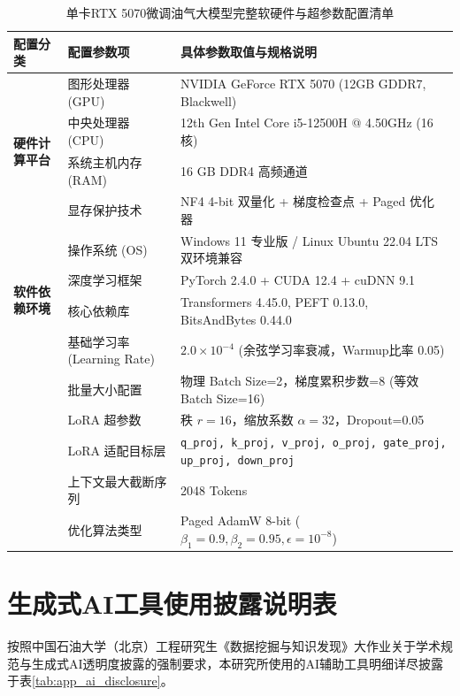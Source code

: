 \documentclass[UTF8,a4paper,zihao=-4,openany,twoside]{ctexbook}
\begin{document}
\begin{table}[htbp]
\centering
\caption{单卡RTX 5070微调油气大模型完整软硬件与超参数配置清单}
\label{tab:app_hyperparams}
\begin{tabularx}{\textwidth}{llX}
\toprule
\textbf{配置分类} & \textbf{配置参数项} & \textbf{具体参数取值与规格说明} \\
\midrule
\multirow{4}{*}{\textbf{硬件计算平台}} & 图形处理器 (GPU) & NVIDIA GeForce RTX 5070 (12GB GDDR7, Blackwell) \\
& 中央处理器 (CPU) & 12th Gen Intel Core i5-12500H @ 4.50GHz (16核) \\
& 系统主机内存 (RAM) & 16 GB DDR4 高频通道 \\
& 显存保护技术 & NF4 4-bit 双量化 + 梯度检查点 + Paged 优化器 \\
\midrule
\multirow{4}{*}{\textbf{软件依赖环境}} & 操作系统 (OS) & Windows 11 专业版 / Linux Ubuntu 22.04 LTS 双环境兼容 \\
& 深度学习框架 & PyTorch 2.4.0 + CUDA 12.4 + cuDNN 9.1 \\
& 核心依赖库 & Transformers 4.45.0, PEFT 0.13.0, BitsAndBytes 0.44.0 \\
\midrule
\multirow{6}{*}{\textbf{微调核心超参数}} & 基础学习率 (Learning Rate) & $2.0 \times 10^{-4}$ (余弦学习率衰减，Warmup比率 0.05) \\
& 批量大小配置 & 物理 Batch Size=2，梯度累积步数=8 (等效 Batch Size=16) \\
& LoRA 超参数 & 秩 $r=16$，缩放系数 $\alpha=32$，Dropout=0.05 \\
& LoRA 适配目标层 & \texttt{q\_proj, k\_proj, v\_proj, o\_proj, gate\_proj, up\_proj, down\_proj} \\
& 上下文最大截断序列 & 2048 Tokens \\
& 优化算法类型 & Paged AdamW 8-bit ($\beta_1=0.9, \beta_2=0.95, \epsilon=10^{-8}$) \\
\bottomrule
\end{tabularx}
\end{table}

\chapter{生成式AI工具使用披露说明表}
\label{app:ai_disclosure}

按照中国石油大学（北京）工程研究生《数据挖掘与知识发现》大作业关于学术规范与生成式AI透明度披露的强制要求，本研究所使用的AI辅助工具明细详尽披露于表\ref{tab:app_ai_disclosure}。
\end{document}
